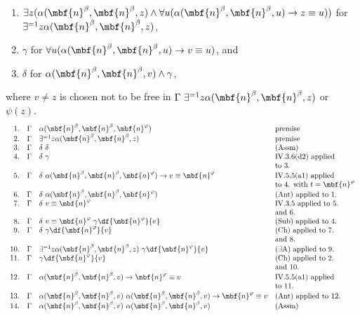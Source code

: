\begin{enumerate}[1.]
\begin{enumerate}[(a)]
\begin{center}
\begin{enumerate}[1$^\circ$]
\item $\exists z (\alpha(\mbf{n}^\beta, \mbf{n}^\beta, z) \land \forall u (\alpha(\mbf{n}^\beta, \mbf{n}^\beta, u) \rightarrow z \equiv u))$ for $\exists^{=1} z \alpha(\mbf{n}^\beta, \mbf{n}^\beta, z)$,
\item $\gamma$ for $\forall u (\alpha(\mbf{n}^\beta, \mbf{n}^\beta, u) \rightarrow v \equiv u)$, and
\item $\delta$ for $\alpha(\mbf{n}^\beta, \mbf{n}^\beta, v) \land \gamma$,
\end{enumerate}
\end{center}
where $v \neq z$ is chosen not to be free in $\Gamma \ \exists^{=1} z \alpha( \mbf{n}^\beta, \mbf{n}^\beta, z)$ or $\psi(z)$.\newpage
\[
\begin{array}{rlll}
1. & \Gamma & \alpha(\mbf{n}^\beta, \mbf{n}^\beta, \mbf{n}^\varphi) & \mbox{premise} \cr
2. & \Gamma & \exists^{=1} z \alpha(\mbf{n}^\beta, \mbf{n}^\beta, z) & \mbox{premise} \cr
3. & \Gamma & \delta \ \delta & \mbox{(Assm)} \cr
4. & \Gamma & \delta \ \gamma & \mbox{IV.3.6(d2) applied} \cr
\ & \ & \ & \mbox{to 3.} \cr
5. & \Gamma & \delta \ \alpha(\mbf{n}^\beta, \mbf{n}^\beta, \mbf{n}^\varphi) \rightarrow v \equiv \mbf{n}^\varphi & \mbox{IV.5.5(a1) applied} \cr
\ & \ & \ & \mbox{to 4. with $t = \mbf{n}^\varphi$} \cr
6. & \Gamma & \delta \ \alpha(\mbf{n}^\beta, \mbf{n}^\beta, \mbf{n}^\varphi) & \mbox{(Ant) applied to 1.} \cr
7. & \Gamma & \delta \ v \equiv \mbf{n}^\varphi & \mbox{IV.3.5 applied to 5.} \cr
\ & \ & \ & \mbox{and 6.} \cr
8. & \Gamma & \delta \ v \equiv \mbf{n}^\varphi \ \gamma \df{\mbf{n}^\varphi}{v} & \mbox{(Sub) applied to 4.} \cr
9. & \Gamma & \delta \ \gamma \df{\mbf{n}^\varphi}{v} & \mbox{(Ch) applied to 7.} \cr
\ & \ & \ & \mbox{and 8.} \cr
10. & \Gamma & \exists^{=1} z \alpha(\mbf{n}^\beta, \mbf{n}^\beta, z) \ \gamma \df{\mbf{n}^\varphi}{v} & \mbox{($\exists$A) applied to 9.} \cr
11. & \Gamma & \gamma \df{\mbf{n}^\varphi}{v} & \mbox{(Ch) applied to 2.} \cr
\ & \ & \ & \mbox{and 10.} \cr
12. & \Gamma & \alpha ( \mbf{n}^\beta, \mbf{n}^\beta, v) \rightarrow \mbf{n}^\varphi \equiv v & \mbox{IV.5.5(a1) applied} \cr
\ & \ & \ & \mbox{to 11.} \cr
13. & \Gamma & \alpha ( \mbf{n}^\beta, \mbf{n}^\beta, v) \ \alpha ( \mbf{n}^\beta, \mbf{n}^\beta, v) \rightarrow \mbf{n}^\varphi \equiv v & \mbox{(Ant) applied to 12.} \cr
14. & \Gamma & \alpha ( \mbf{n}^\beta, \mbf{n}^\beta, v) \ \alpha ( \mbf{n}^\beta, \mbf{n}^\beta, v) & \mbox{(Assm)} \cr

\end{array}\]
\end{enumerate}
\end{enumerate}
